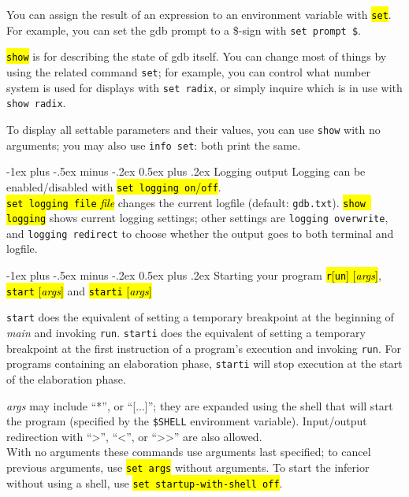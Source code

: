 \documentclass[a4paper,landscape]{article}
\makeatletter
\renewcommand{\section}{\@startsection{section}{1}{0mm}%
                                {-1ex plus -.5ex minus -.2ex}%
                                {0.5ex plus .2ex}%
                                {\normalfont\large\bfseries}}
\makeatother
\begin{document}
\begin{multicols*}{3}
You can assign the result of an expression to an environment variable with \hl{\texttt{set}}.
For example, you can set the gdb prompt to a \$-sign with \texttt{set prompt \$}.

\hl{\texttt{show}} is for describing the state of gdb itself. You can
change most of things by using the related command \texttt{set};
for example, you can control what number system is used for displays with \texttt{set
radix}, or simply inquire which is in use with \texttt{show radix}.

To display all settable parameters and their values, you can use
\texttt{show} with no arguments; you may also use \texttt{info set}: both print the same.

\section{Logging output}
Logging can be enabled/disabled with \hl{\texttt{set logging on}/\texttt{off}}. \\
\hl{\texttt{set logging file}\textit{ file}} changes the current logfile
(default: \texttt{gdb.txt}).
\hl{\texttt{show logging}} shows current logging settings; other settings are
\texttt{logging overwrite}, and
\texttt{logging redirect} to choose whether the output goes to both terminal and logfile.

\section{Starting your program}
\hl{\texttt{r}[\texttt{un}] [\textit{args}]},
\hl{\texttt{start} [\textit{args}]} and
\hl{\texttt{starti} [\textit{args}]}

\texttt{start} does the equivalent of setting a temporary breakpoint
at the beginning of \emph{main} and invoking \texttt{run}.
\texttt{starti} does the equivalent of setting a temporary breakpoint
at the first instruction of a program's execution and invoking \texttt{run}.
For programs containing an elaboration phase, \texttt{starti}
will stop execution at the start of the elaboration phase.

\textit{args} may include ``*'', or ``[...]''; they are expanded using the
shell that will start the program (specified by the \texttt{\$SHELL} environment
variable).  Input/output redirection with ``>'', ``<'', or ``>{}>'' are also allowed. \\
With no arguments these commands use arguments last specified;
to cancel previous arguments, use \hl{\texttt{set args}} without arguments.
To start the inferior without using a shell, use \hl{\texttt{set startup-with-shell off}}.


\end{multicols*}
\end{document}
